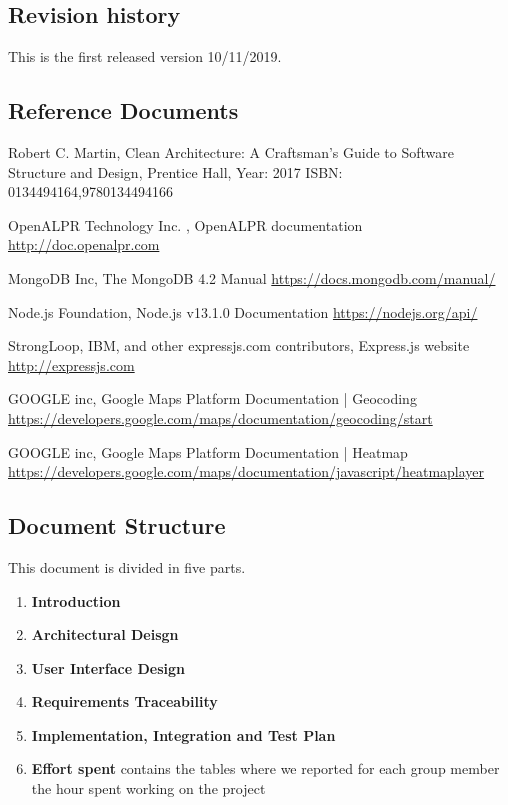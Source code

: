 \subsection{Revision history}
This is the first released version 10/11/2019.

\subsection{Reference Documents}
\begin{thebibliography}{00}

 Robert C. Martin,
Clean Architecture: A Craftsman’s Guide to Software Structure and Design,
Prentice Hall, Year: 2017
ISBN: 0134494164,9780134494166

OpenALPR Technology Inc. ,
OpenALPR documentation \url{http://doc.openalpr.com}

 MongoDB Inc,
The MongoDB 4.2 Manual
\url{https://docs.mongodb.com/manual/}

 Node.js Foundation,
Node.js v13.1.0 Documentation
\url{https://nodejs.org/api/}

 StrongLoop, IBM, and other expressjs.com contributors,
Express.js website
\url{http://expressjs.com}

 GOOGLE inc,
 Google Maps Platform Documentation | Geocoding
 \url{https://developers.google.com/maps/documentation/geocoding/start}

 GOOGLE inc,
 Google Maps Platform Documentation | Heatmap
 \url{https://developers.google.com/maps/documentation/javascript/heatmaplayer}

\end{thebibliography}

\subsection{Document Structure}
This document is divided in five parts.

\begin{enumerate}
  \item \textbf{Introduction}

  \item \textbf{Architectural Deisgn}

  \item \textbf{User Interface Design}

  \item \textbf{Requirements Traceability}

  \item \textbf{Implementation, Integration and Test Plan}

  \item \textbf{Effort spent} contains the tables where we reported for each group member the hour spent working on the project
\end{enumerate}
